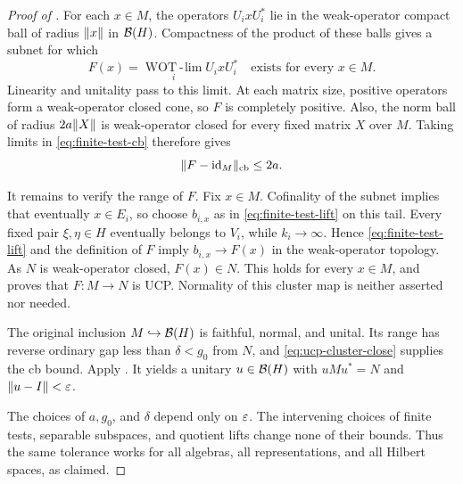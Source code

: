 \begin{proof}[Proof of ]
For each $x\in M$, the operators $U_ixU_i^*$ lie in the
weak-operator compact ball of radius $\lVert x\rVert$ in $\mathcal B(H)$.
Compactness of the product of these balls gives a subnet for which
\[
 F(x)=\operatorname*{WOT\!\!-\!lim}_i U_ixU_i^*
 \quad\text{exists for every }x\in M.
\]
Linearity and unitality pass to this limit.  At each matrix size,
positive operators form a weak-operator closed cone, so $F$ is
completely positive.  Also, the norm ball of radius $2a\lVert X\rVert$
is weak-operator closed for every fixed matrix $X$ over $M$.
Taking limits in \eqref{eq:finite-test-cb} therefore gives
\begin{equation}\label{eq:ucp-cluster-close}
 \lVert F-\operatorname{id}_M\rVert_{\mathrm{cb}}\leq2a.
\end{equation}

It remains to verify the range of $F$.  Fix $x\in M$.  Cofinality
of the subnet implies that eventually $x\in E_i$, so choose
$b_{i,x}$ as in \eqref{eq:finite-test-lift} on this tail.  Every
fixed pair $\xi,\eta\in H$ eventually belongs to $V_i$, while
$k_i\to\infty$.  Hence \eqref{eq:finite-test-lift} and the definition
of $F$ imply $b_{i,x}\to F(x)$ in the weak-operator topology.
As $N$ is weak-operator closed, $F(x)\in N$.  This holds for every
$x\in M$, and proves that $F:M\to N$ is UCP.  Normality of this
cluster map is neither asserted nor needed.

The original inclusion $M\hookrightarrow\mathcal B(H)$ is faithful,
normal, and unital.  Its range has reverse ordinary gap less than
$\delta<g_0$ from $N$, and \eqref{eq:ucp-cluster-close} supplies the
cb bound.  Apply .  It yields a unitary $u\in\mathcal B(H)$
with $uMu^*=N$ and $\lVert u-I\rVert<\varepsilon$.

The choices of $a,g_0$, and $\delta$ depend only on $\varepsilon$.
The intervening choices of finite tests, separable subspaces, and
quotient lifts change none of their bounds.  Thus the same tolerance
works for all algebras, all representations, and all Hilbert spaces,
as claimed.
\end{proof}
